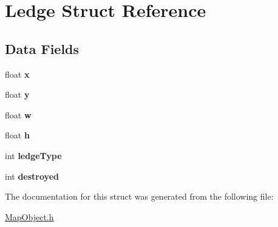 \hypertarget{struct_ledge}{}\section{Ledge Struct Reference}
\label{struct_ledge}
\subsection*{Data Fields}
\begin{DoxyCompactItemize}
\item 
\hypertarget{struct_ledge_ad0da36b2558901e21e7a30f6c227a45e}{}float {\bfseries x}\label{struct_ledge_ad0da36b2558901e21e7a30f6c227a45e}

\item 
\hypertarget{struct_ledge_aa4f0d3eebc3c443f9be81bf48561a217}{}float {\bfseries y}\label{struct_ledge_aa4f0d3eebc3c443f9be81bf48561a217}

\item 
\hypertarget{struct_ledge_a56eca241e2896b9f57a79589e76fd24b}{}float {\bfseries w}\label{struct_ledge_a56eca241e2896b9f57a79589e76fd24b}

\item 
\hypertarget{struct_ledge_a85f2f1bd58b3b44ffdf3881823393959}{}float {\bfseries h}\label{struct_ledge_a85f2f1bd58b3b44ffdf3881823393959}

\item 
\hypertarget{struct_ledge_a9fa7acedfa915835bf13cf2b94d9c277}{}int {\bfseries ledge\+Type}\label{struct_ledge_a9fa7acedfa915835bf13cf2b94d9c277}

\item 
\hypertarget{struct_ledge_a5a336f521f079401de26fdadccef961a}{}int {\bfseries destroyed}\label{struct_ledge_a5a336f521f079401de26fdadccef961a}

\end{DoxyCompactItemize}


The documentation for this struct was generated from the following file\+:\begin{DoxyCompactItemize}
\item 
\hyperlink{_map_object_8h}{Map\+Object.\+h}\end{DoxyCompactItemize}
